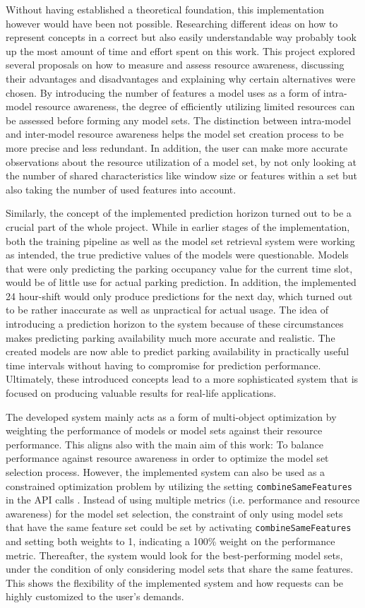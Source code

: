 Without having established a theoretical foundation, this implementation however would have been not possible. Researching different ideas on how to represent concepts in a correct but also easily understandable way probably took up the most amount of time and effort spent on this work. This project explored several proposals on how to measure and assess resource awareness, discussing their advantages and disadvantages and explaining why certain alternatives were chosen. By introducing the number of features a model uses as a form of intra-model resource awareness, the degree of efficiently utilizing limited resources can be assessed before forming any model sets. The distinction between intra-model and inter-model resource awareness helps the model set creation process to be more precise and less redundant. In addition, the user can make more accurate observations about the resource utilization of a model set, by not only looking at the number of shared characteristics like window size or features within a set but also taking the number of used features into account.

Similarly, the concept of the implemented prediction horizon turned out to be a crucial part of the whole project. While in earlier stages of the implementation, both the training pipeline as well as the model set retrieval system were working as intended, the true predictive values of the models were questionable. Models that were only predicting the parking occupancy value for the current time slot, would be of little use for actual parking prediction. In addition, the implemented 24 hour-shift would only produce predictions for the next day, which turned out to be rather inaccurate as well as unpractical for actual usage. The idea of introducing a prediction horizon to the system because of these circumstances makes predicting parking availability much more accurate and realistic. The created models are now able to predict parking availability in practically useful time intervals without having to compromise for prediction performance. Ultimately, these introduced concepts lead to a more sophisticated system that is focused on producing valuable results for real-life applications.

The developed system mainly acts as a form of multi-object optimization by weighting the performance of models or model sets against their resource performance. This aligns also with the main aim of this work: To balance performance against resource awareness in order to optimize the model set selection process. However, the implemented system can also be used as a constrained optimization problem by utilizing the setting \texttt{combineSameFeatures} in the API calls \cite{feurer2019}. Instead of using multiple metrics (i.e. performance and resource awareness) for the model set selection, the constraint of only using model sets that have the same feature set could be set by activating \texttt{combineSameFeatures} and setting both weights to 1, indicating a 100\% weight on the performance metric. Thereafter, the system would look for the best-performing model sets, under the condition of only considering model sets that share the same features. This shows the flexibility of the implemented system and how requests can be highly customized to the user's demands.

